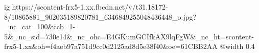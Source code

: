  
 
 
 
 

\ifcmt
  ig https://scontent-frx5-1.xx.fbcdn.net/v/t31.18172-8/10865881_902035189820781_6346849255048436448_o.jpg?_nc_cat=100&ccb=1-5&_nc_sid=730e14&_nc_ohc=E4GKumGCIfkAX9lqFgW&_nc_ht=scontent-frx5-1.xx&oh=f4aeb97a751d9cc0d2125ad8d5e38f40&oe=61CBB2AA
  @width 0.4
\fi
